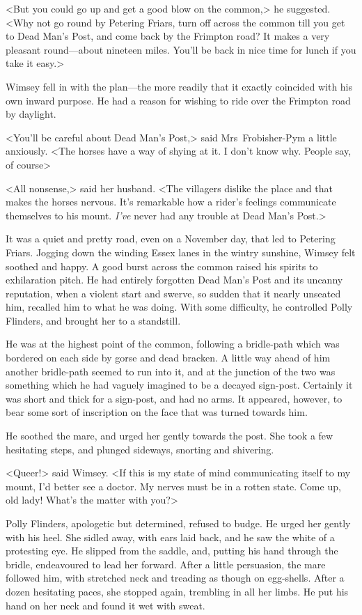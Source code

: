 <But you could go up and get a good blow on the common,> he suggested. <Why not go round by Petering Friars, turn off across the common till you get to Dead Man's Post, and come back by the Frimpton road? It makes a very pleasant round—about nineteen miles. You'll be back in nice time for lunch if you take it easy.>

Wimsey fell in with the plan—the more readily that it exactly coincided with his own inward purpose. He had a reason for wishing to ride over the Frimpton road by daylight.

<You'll be careful about Dead Man's Post,> said Mrs~Frobisher-Pym a little anxiously. <The horses have a way of shying at it. I don't know why. People say, of course\longdash>

<All nonsense,> said her husband. <The villagers dislike the place and that makes the horses nervous. It's remarkable how a rider's feelings communicate themselves to his mount. \emph{I've} never had any trouble at Dead Man's Post.>

It was a quiet and pretty road, even on a November day, that led to Petering Friars. Jogging down the winding Essex lanes in the wintry sunshine, Wimsey felt soothed and happy. A good burst across the common raised his spirits to exhilaration pitch. He had entirely forgotten Dead Man's Post and its uncanny reputation, when a violent start and swerve, so sudden that it nearly unseated him, recalled him to what he was doing. With some difficulty, he controlled Polly Flinders, and brought her to a standstill.

He was at the highest point of the common, following a bridle-path which was bordered on each side by gorse and dead bracken. A little way ahead of him another bridle-path seemed to run into it, and at the junction of the two was something which he had vaguely imagined to be a decayed sign-post. Certainly it was short and thick for a sign-post, and had no arms. It appeared, however, to bear some sort of inscription on the face that was turned towards him.

He soothed the mare, and urged her gently towards the post. She took a few hesitating steps, and plunged sideways, snorting and shivering.

<Queer!> said Wimsey. <If this is my state of mind communicating itself to my mount, I'd better see a doctor. My nerves must be in a rotten state. Come up, old lady! What's the matter with you?>

Polly Flinders, apologetic but determined, refused to budge. He urged her gently with his heel. She sidled away, with ears laid back, and he saw the white of a protesting eye. He slipped from the saddle, and, putting his hand through the bridle, endeavoured to lead her forward. After a little persuasion, the mare followed him, with stretched neck and treading as though on egg-shells. After a dozen hesitating paces, she stopped again, trembling in all her limbs. He put his hand on her neck and found it wet with sweat.

